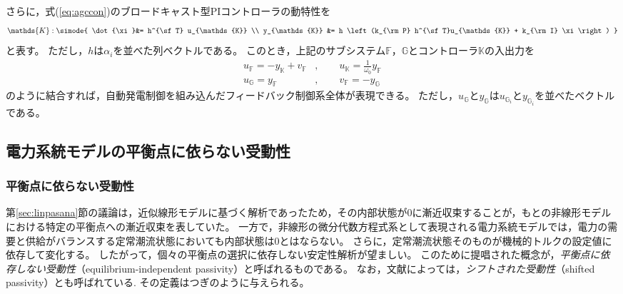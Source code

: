 \documentclass[tombow,dvipdfmx]{corona-a5-1.1}
\begin{document}
さらに，式(\ref{eq:agccon})のブロードキャスト型PIコントローラの動特性を
\begin{align}\label{eq:condsK}
\mathds{K}: \simode{
\dot{\xi}&=  h^{\sf T} u_{\mathds{K}} \\
y_{\mathds{K}} &= h \left(k_{\rm P} h^{\sf T}u_{\mathds{K}} +  k_{\rm I} \xi \right)
}
\end{align}
と表す。
ただし，$h$は$\alpha_i$を並べた列ベクトルである。
このとき，上記のサブシステム$\mathds{F}$，$\mathds{G}$とコントローラ$\mathds{K}$の入出力を
\begin{subequations}\label{eq:connds}
\begin{align}
u_{\mathds{F}} = - y_{\mathds{K}} + v_{\mathds{F}}&
,\qquad u_{\mathds{K}} = \frac{1}{\omega_0} y_{\mathds{F}}	\label{eq:connds1}
\\
u_{\mathds{G}} = y_{\mathds{F}}&
,\qquad
v_{\mathds{F}} = - y_{\mathds{G}}		\label{eq:connds2}
\end{align}
\end{subequations}
のように結合すれば，自動発電制御を組み込んだフィードバック制御系全体が表現できる。
ただし，$u_{\mathds{G}}$と$y_{\mathds{G}}$は$u_{\mathds{G}_i}$と$y_{\mathds{G}_i}$を並べたベクトルである。



\subsection{電力系統モデルの平衡点に依らない受動性\advanced}

\subsubsection{平衡点に依らない受動性}

第\ref{sec:linpasana}節の議論は，近似線形モデルに基づく解析であったため，その内部状態が0に漸近収束することが，もとの非線形モデルにおける特定の平衡点への漸近収束を表していた。
一方で，非線形の微分代数方程式系として表現される電力系統モデルでは，電力の需要と供給がバランスする定常潮流状態においても内部状態は0とはならない。
さらに，定常潮流状態そのものが機械的トルクの設定値に依存して変化する。
したがって，個々の平衡点の選択に依存しない安定性解析が望ましい。
このために提唱された概念が，\emph{平衡点に依存しない受動性}（equilibrium-independent passivity）と呼ばれるものである\cite{hines2011equilibrium,simpson2019equilibrium}。
なお，文献によっては，\emph{シフトされた受動性}（shifted passivity）とも呼ばれている\cite{monshizadeh2019conditions}.
その定義はつぎのように与えられる。
\end{document}
